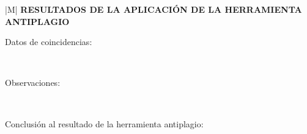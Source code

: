 \noindent
\begin{tabular}{|M{\textwidth}|}
\hline
\textbf{\small RESULTADOS DE LA APLICACIÓN DE LA HERRAMIENTA ANTIPLAGIO}\vspace*{-5pt}\\
\hline
\end{tabular}

\begin{description}
  \item[Datos de coincidencias:] ~
        \vspace{3.5cm}
  \item[Observaciones:] ~
        \vspace{3.5cm}
  \item[Conclusión al resultado de la herramienta antiplagio:] ~
        \vspace{4cm}
\end{description}

